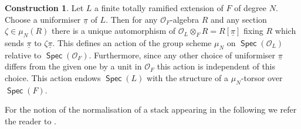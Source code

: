\documentclass{article}
\DeclareMathOperator{\Fb}{\mathbb{F}}
\DeclareMathOperator{\Xc}{\mathcal{X}}
\DeclareMathOperator{\Spec}{\mathsf{Spec}}
\newcommand{\CO}{{\mathcal O}}
\theoremstyle{definition}
\newtheorem{construction}[definition]{Construction}
\theoremstyle{plain}
\newtheorem{example}[definition]{Example}
\begin{document}

\begin{construction} \label{LTors}
Let $L$ a finite totally ramified extension of $F$ of degree $N$. Choose a uniformiser $\underline{\pi}$ of $L$. Then for any $\CO_F$-algebra $R$ and any section $\zeta \in \mu_N(R)$ there is a unique automorphism of $\CO_L \otimes_F R=R[\underline{\pi}]$ fixing $R$ which sends $\underline{\pi}$ to $\zeta \underline{\pi}$. This defines an action of the group scheme $\mu_N$ on $\Spec(\CO_L)$ relative to $\Spec(\CO_F)$. Furthermore, since any other choice of uniformiser $\underline{\pi}$ differs from the given one by a unit in $\CO_F$ this action is independent of this choice. This action endows $\Spec(L)$ with the structure of a $\mu_N$-torsor over $\Spec(F)$.
\end{construction}

For the notion of the normalisation of a stack appearing in the following we refer the reader to \cite[Appendix A]{ascher2017moduli}.
\end{document}
